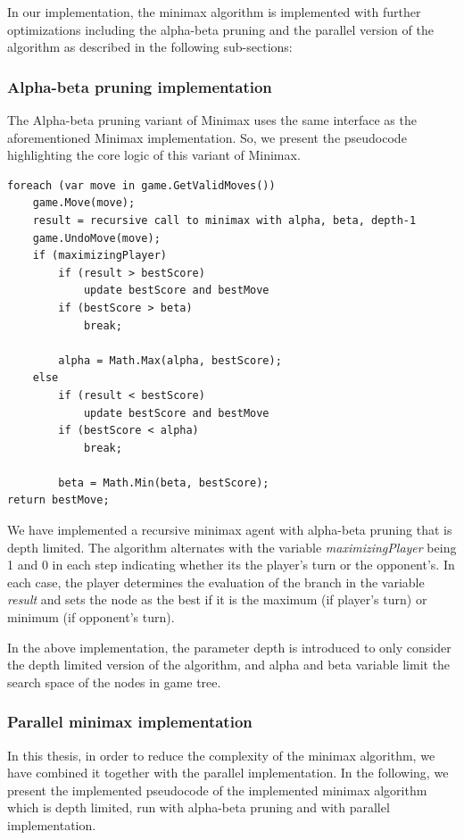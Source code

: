 In our implementation, the minimax algorithm is implemented with further optimizations including the alpha-beta pruning and the parallel version of the algorithm as described in the following sub-sections:

\subsubsection{Alpha-beta pruning implementation}
The Alpha-beta pruning variant of Minimax uses the same interface as the aforementioned Minimax implementation. So, we present the pseudocode highlighting the core logic of this variant of Minimax.

\begin{lstlisting}
foreach (var move in game.GetValidMoves())
    game.Move(move);
    result = recursive call to minimax with alpha, beta, depth-1
    game.UndoMove(move);
    if (maximizingPlayer)
        if (result > bestScore)
            update bestScore and bestMove
        if (bestScore > beta)
            break;

        alpha = Math.Max(alpha, bestScore);
    else
        if (result < bestScore)
            update bestScore and bestMove
        if (bestScore < alpha)
            break;

        beta = Math.Min(beta, bestScore);
return bestMove;
\end{lstlisting}

We have implemented a recursive minimax agent with alpha-beta pruning that is depth limited. The algorithm alternates with the variable \textit{maximizingPlayer} being 1 and 0 in each step indicating whether its the player's turn or the opponent's. In each case, the player determines the evaluation of the branch in the variable \textit{result} and sets the node as the best if it is the maximum (if player's turn) or minimum (if opponent's turn).

In the above implementation, the parameter depth is introduced to only consider the depth limited version of the algorithm, and alpha and beta variable limit the search space of the nodes in game tree.

\subsubsection{Parallel minimax implementation}


In this thesis, in order to reduce the complexity of the minimax algorithm, we have combined it together with the parallel implementation. In the following, we present the implemented pseudocode of the implemented minimax algorithm which is depth limited, run with alpha-beta pruning and with parallel implementation. 


